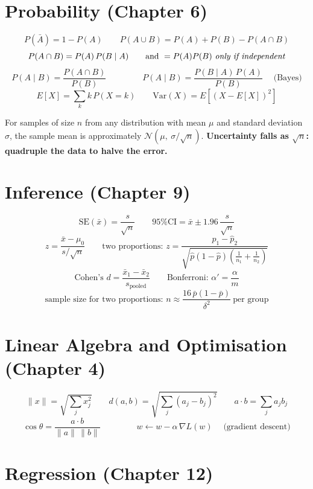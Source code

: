 \section{Probability (Chapter 6)}

\[
P(\bar{A}) = 1 - P(A)
\qquad
P(A\cup B)=P(A)+P(B)-P(A\cap B)
\]
\[
P(A\cap B)=P(A)\,P(B\mid A)
\qquad\text{and }=P(A)P(B)\ \text{\emph{only if independent}}
\]
\[
P(A \mid B) = \frac{P(A\cap B)}{P(B)}
\qquad\qquad
\boxed{\;P(A\mid B) = \frac{P(B\mid A)\,P(A)}{P(B)}\;}\quad\text{(Bayes)}
\]
\[
E[X]=\sum_k k\,P(X=k)
\qquad
\text{Var}(X)=E[(X-E[X])^2]
\]

\begin{conceptbox}
For samples of size $n$ from any distribution with mean $\mu$ and standard
deviation $\sigma$, the sample mean is approximately
$\mathcal{N}\!\left(\mu,\ \sigma/\sqrt{n}\right)$. \textbf{Uncertainty falls as
$\sqrt{n}$: quadruple the data to halve the error.}
\end{conceptbox}

\section{Inference (Chapter 9)}

\[
\text{SE}(\bar{x}) = \frac{s}{\sqrt{n}}
\qquad
\text{95\% CI} = \bar{x} \pm 1.96\,\frac{s}{\sqrt{n}}
\]
\[
z = \frac{\bar{x}-\mu_0}{s/\sqrt{n}}
\qquad
\text{two proportions: } z = \frac{\hat{p}_1-\hat{p}_2}
{\sqrt{\hat{p}(1-\hat{p})\left(\frac{1}{n_1}+\frac{1}{n_2}\right)}}
\]
\[
\text{Cohen's } d = \frac{\bar{x}_1-\bar{x}_2}{s_{\text{pooled}}}
\qquad
\text{Bonferroni: } \alpha' = \frac{\alpha}{m}
\]
\[
\text{sample size for two proportions: } n \approx \frac{16\,\bar{p}(1-\bar{p})}{\delta^2}
\ \text{per group}
\]

\section{Linear Algebra and Optimisation (Chapter 4)}

\[
\|x\| = \sqrt{\textstyle\sum_j x_j^2}
\qquad
d(a,b) = \sqrt{\textstyle\sum_j (a_j-b_j)^2}
\qquad
a\cdot b = \textstyle\sum_j a_j b_j
\]
\[
\cos\theta = \frac{a\cdot b}{\|a\|\,\|b\|}
\qquad\qquad
\boxed{\;w \leftarrow w - \alpha\,\nabla L(w)\;}\quad\text{(gradient descent)}
\]

\section{Regression (Chapter 12)}

